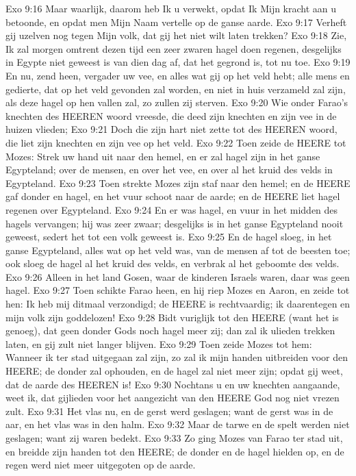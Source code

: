 Exo 9:16  Maar waarlijk, daarom heb Ik u verwekt, opdat Ik Mijn kracht aan u betoonde, en opdat men Mijn Naam vertelle op de ganse aarde.
Exo 9:17  Verheft gij uzelven nog tegen Mijn volk, dat gij het niet wilt laten trekken?
Exo 9:18  Zie, Ik zal morgen omtrent dezen tijd een zeer zwaren hagel doen regenen, desgelijks in Egypte niet geweest is van dien dag af, dat het gegrond is, tot nu toe.
Exo 9:19  En nu, zend heen, vergader uw vee, en alles wat gij op het veld hebt; alle mens en gedierte, dat op het veld gevonden zal worden, en niet in huis verzameld zal zijn, als deze hagel op hen vallen zal, zo zullen zij sterven.
Exo 9:20  Wie onder Farao's knechten des HEEREN woord vreesde, die deed zijn knechten en zijn vee in de huizen vlieden;
Exo 9:21  Doch die zijn hart niet zette tot des HEEREN woord, die liet zijn knechten en zijn vee op het veld.
Exo 9:22  Toen zeide de HEERE tot Mozes: Strek uw hand uit naar den hemel, en er zal hagel zijn in het ganse Egypteland; over de mensen, en over het vee, en over al het kruid des velds in Egypteland.
Exo 9:23  Toen strekte Mozes zijn staf naar den hemel; en de HEERE gaf donder en hagel, en het vuur schoot naar de aarde; en de HEERE liet hagel regenen over Egypteland.
Exo 9:24  En er was hagel, en vuur in het midden des hagels vervangen; hij was zeer zwaar; desgelijks is in het ganse Egypteland nooit geweest, sedert het tot een volk geweest is.
Exo 9:25  En de hagel sloeg, in het ganse Egypteland, alles wat op het veld was, van de mensen af tot de beesten toe; ook sloeg de hagel al het kruid des velds, en verbrak al het geboomte des velds.
Exo 9:26  Alleen in het land Gosen, waar de kinderen Israels waren, daar was geen hagel.
Exo 9:27  Toen schikte Farao heen, en hij riep Mozes en Aaron, en zeide tot hen: Ik heb mij ditmaal verzondigd; de HEERE is rechtvaardig; ik daarentegen en mijn volk zijn goddelozen!
Exo 9:28  Bidt vuriglijk tot den HEERE (want het is genoeg), dat geen donder Gods noch hagel meer zij; dan zal ik ulieden trekken laten, en gij zult niet langer blijven.
Exo 9:29  Toen zeide Mozes tot hem: Wanneer ik ter stad uitgegaan zal zijn, zo zal ik mijn handen uitbreiden voor den HEERE; de donder zal ophouden, en de hagel zal niet meer zijn; opdat gij weet, dat de aarde des HEEREN is!
Exo 9:30  Nochtans u en uw knechten aangaande, weet ik, dat gijlieden voor het aangezicht van den HEERE God nog niet vrezen zult.
Exo 9:31  Het vlas nu, en de gerst werd geslagen; want de gerst was in de aar, en het vlas was in den halm.
Exo 9:32  Maar de tarwe en de spelt werden niet geslagen; want zij waren bedekt.
Exo 9:33  Zo ging Mozes van Farao ter stad uit, en breidde zijn handen tot den HEERE; de donder en de hagel hielden op, en de regen werd niet meer uitgegoten op de aarde.

